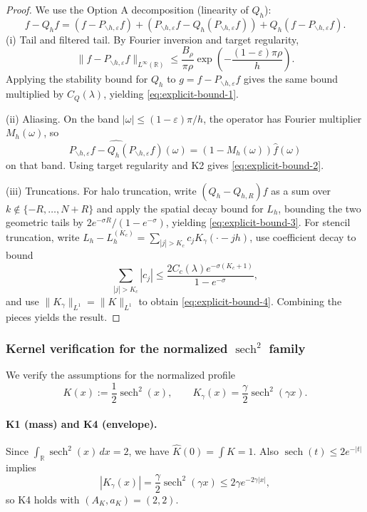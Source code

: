 \documentclass[11pt]{article}
\newcommand{\R}{\mathbb{R}}
\newcommand{\wh}[1]{\widehat{#1}}
\newcommand{\sech}{\operatorname{sech}}
\begin{document}
\begin{proof}
We use the Option A decomposition (linearity of $Q_h$):
\[
f-Q_hf = (f-P_{\backslash h,\varepsilon}f) + (P_{\backslash h,\varepsilon}f-Q_h(P_{\backslash h,\varepsilon}f)) + Q_h(f-P_{\backslash h,\varepsilon}f).
\]
(i) Tail and filtered tail. By Fourier inversion and target regularity,
\[
\|f-P_{\backslash h,\varepsilon}f\|_{L^\infty(\R)}\le \frac{B_\rho}{\pi\rho}\exp\!\left(-\frac{(1-\varepsilon)\pi\rho}{h}\right).
\]
Applying the stability bound for $Q_h$ to $g=f-P_{\backslash h,\varepsilon}f$ gives the same bound multiplied by $C_Q(\lambda)$, yielding \eqref{eq:explicit-bound-1}. 

(ii) Aliasing. On the band $|\omega|\le (1-\varepsilon)\pi/h$, the operator has Fourier multiplier $M_h(\omega)$, so
\[
\widehat{P_{\backslash h,\varepsilon}f-Q_h(P_{\backslash h,\varepsilon}f)}(\omega)=(1-M_h(\omega))\wh f(\omega)
\]
on that band. Using target regularity and K2 gives \eqref{eq:explicit-bound-2}.

(iii) Truncations. For halo truncation, write $(Q_h-Q_{h,R})f$ as a sum over $k\notin\{-R,\dots,N+R\}$ and apply the spatial decay bound for $L_h$, bounding the two geometric tails by $2e^{-\sigma R}/(1-e^{-\sigma})$, yielding \eqref{eq:explicit-bound-3}. For stencil truncation, write $L_h-L_h^{(K_c)}=\sum_{|j|>K_c}c_j K_\gamma(\cdot-jh)$, use coefficient decay to bound
\[
\sum_{|j|>K_c}|c_j|\le \frac{2C_c(\lambda)e^{-\sigma(K_c+1)}}{1-e^{-\sigma}},
\]
and use $\|K_\gamma\|_{L^1}=\|K\|_{L^1}$ to obtain \eqref{eq:explicit-bound-4}. Combining the pieces yields the result.
\end{proof}

\subsubsection{Kernel verification for the normalized $\sech^2$ family}
We verify the assumptions for the normalized profile
\begin{equation}
K(x):=\frac12\sech^2(x),
\qquad
K_\gamma(x)=\frac{\gamma}{2}\sech^2(\gamma x).
\label{eq:sech-kernel}
\end{equation}

\paragraph{K1 (mass) and K4 (envelope).}
Since $\int_{\R}\sech^2(x)\,dx=2$, we have $\wh K(0)=\int K = 1$. Also $\sech(t)\le 2e^{-|t|}$ implies
\begin{equation}
|K_\gamma(x)|=\frac{\gamma}{2}\sech^2(\gamma x)\le 2\gamma e^{-2\gamma|x|},
\label{eq:sech-envelope}
\end{equation}
so K4 holds with $(A_K,a_K)=(2,2)$.
\end{document}

